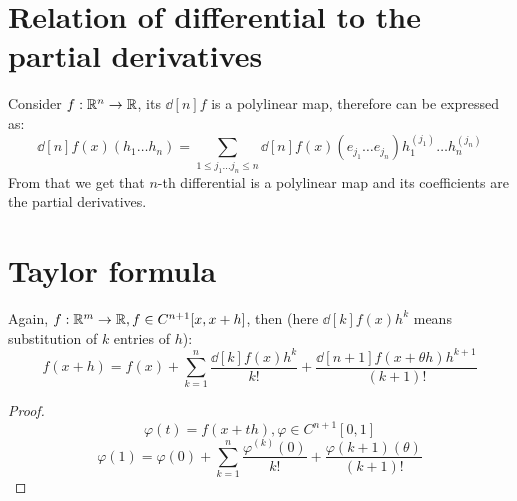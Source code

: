 \section*{Relation of differential to the partial derivatives}
Consider $f: \mathbb R^n \to \mathbb R$, its $\dd[n]{f}$ is a polylinear map, therefore can be expressed as:
\[ \dd[n]{f}(x)(h_1 \dots h_n) = \sum\limits_{1 \leqslant j_1 \dots j_n \leqslant n} \dd[n]{f}(x)(e_{j_1} \dots e_{j_n}) h_1^{(j_1)} \dots h_n^{(j_n)} \]
From that we get that $n$-th differential is a polylinear map and its coefficients are the partial derivatives.

\section*{Taylor formula}
Again, $f: \mathbb R^m \to \mathbb R, f\in C^{n+1}[x, x + h]$, then (here $\dd[k]{f}(x) h^k$ means substitution of $k$ entries of $h$):
\[ f(x + h) = f(x) + \sum\limits_{k=1}^n \frac{\dd[k]{f}(x) h^k}{k!} + \frac{\dd[n + 1]{f}(x + \theta h)h^{k + 1}}{(k + 1)!} \]
\begin{proof}
\[\varphi(t) = f(x + th), \varphi \in C^{n+1}[0, 1]\]
\[\varphi(1) = \varphi(0) + \sum\limits_{k=1}^n \frac{\varphi^{(k)}(0)}{k!} + \frac{\varphi{(k+1)}(\theta)}{(k + 1)!} \]
\end{proof}
